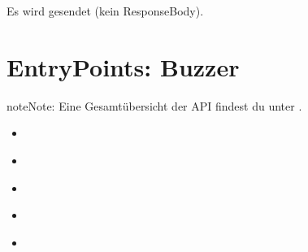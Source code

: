 \documentclass[letterpaper,10pt,english]{sphinxmanual}
\begin{document}
\sphinxAtStartPar
{}

\sphinxAtStartPar
{}
Es wird  gesendet (kein Response\sphinxhyphen{}Body).

\sphinxstepscope


\chapter{Entry\sphinxhyphen{}Points: Buzzer}
\label{\detokenize{agv_rest_api_buzzer:entry-points-buzzer}}\label{\detokenize{agv_rest_api_buzzer::doc}}
\begin{sphinxadmonition}{note}{Note:}
\sphinxAtStartPar
Eine Gesamtübersicht der API findest du unter {\hyperref[\detokenize{index::doc}]{}}.
\end{sphinxadmonition}

\sphinxAtStartPar
{}
\begin{itemize}
\item {} 
\sphinxAtStartPar
{\hyperref[\detokenize{agv_rest_api_buzzer:post-api-agv-buzzer-off}]{}}

\item {} 
\sphinxAtStartPar
{\hyperref[\detokenize{agv_rest_api_buzzer:post-api-agv-buzzer-on}]{}}

\item {} 
\sphinxAtStartPar
{\hyperref[\detokenize{agv_rest_api_buzzer:post-api-agv-buzzer-beeponce}]{}}

\item {} 
\sphinxAtStartPar
{\hyperref[\detokenize{agv_rest_api_buzzer:post-api-agv-buzzer-beepinfinite}]{}}

\item {} 
\sphinxAtStartPar
{\hyperref[\detokenize{agv_rest_api_buzzer:post-api-agv-buzzer-beepntimes}]{}}

\end{itemize}
\end{document}
